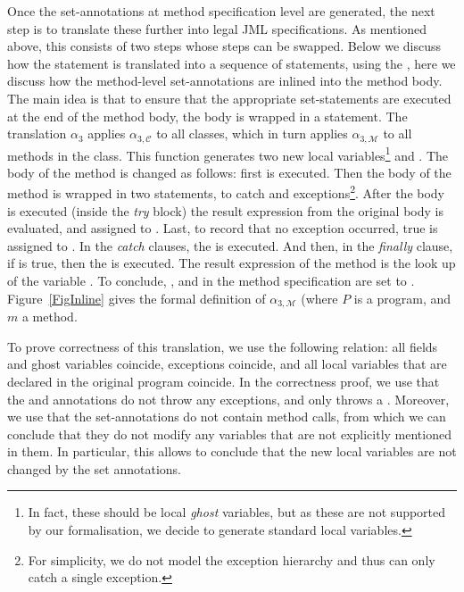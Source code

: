 Once the set-annotations at method specification level are generated,
the next step is to translate these further into legal JML
specifications. As mentioned above, this consists of two steps whose
steps can be swapped. Below we discuss how the \CaseJML statement is
translated into a sequence of \Set statements, using the \CondExpr,
here we discuss how the method-level set-annotations are inlined into
the method body. The main idea is that to ensure that the appropriate
set-statements are executed at the end of the method body, the body is
wrapped in a \TryCatch statement. The translation \(\alpha_3\) applies
\(\alpha_{3, \mathcal{C}}\) to all classes, which in turn applies
\(\alpha_{3, \mathcal{M}}\) to all methods in the class. This function
generates two new local variables\footnote{In fact, these should be
local \emph{ghost} variables, but as these are not supported by our
formalisation, we decide to generate standard local variables.} \resl
and \exl. The body of the method is changed as follows: first \preset
is executed. Then the body of the method is wrapped in two \TryCatch
statements, to catch \Throwable and \NullPointer
exceptions\footnote{For simplicity, we do not model the exception
hierarchy and thus \TryCatch can only catch a single
exception.}. After the body is executed (inside the \emph{try} block)
the result expression from the original body is evaluated, and
assigned to \resl. Last, to record that no exception occurred, true is
assigned to \exl. In the \emph{catch} clauses, the \excset is
executed. And then, in the \emph{finally} clause, if \resl is true,
then the \postset is executed. The result expression of the method is
the look up of the variable \resl. To conclude, \preset, \postset and
\excset in the method specification are set to
\Skip. Figure~\ref{FigInline} gives the formal definition of
\(\alpha_{3, \mathcal{M}}\) (where \(P\) is a program, and \(m\) a method. 

To prove correctness of this translation, we use the following
relation: all fields and ghost variables coincide, exceptions
coincide, and all local variables that are declared in the original
program coincide. In the correctness proof, we use that the \postset
and \excset annotations do not throw any exceptions, and \preset only
throws a \JMLExc. Moreover, we use that the set-annotations do not
contain method calls, from which we can conclude that they do not
modify any variables that are not explicitly mentioned in them. In
particular, this allows to conclude that the new local variables are
not changed by the set annotations.

